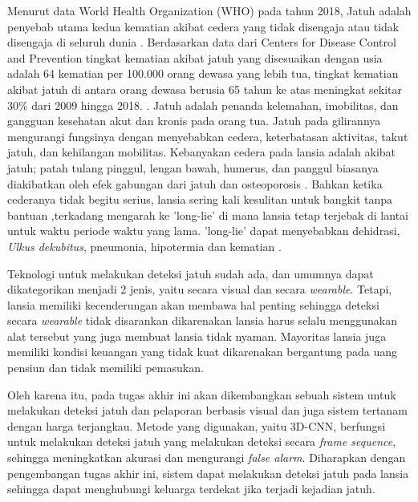 Menurut data World Health Organization (WHO) pada tahun 2018, Jatuh adalah penyebab utama kedua kematian akibat cedera yang tidak disengaja atau tidak disengaja di seluruh dunia \cite{cit:5}. Berdasarkan data dari Centers for Disease Control and Prevention tingkat kematian akibat jatuh yang disesuaikan dengan usia adalah 64 kematian per 100.000 orang dewasa yang lebih tua, tingkat kematian akibat jatuh di antara orang dewasa berusia 65 tahun ke atas meningkat sekitar 30\% dari 2009 hingga 2018. \cite{cit:6}. Jatuh adalah penanda kelemahan, imobilitas, dan gangguan kesehatan akut dan kronis pada orang tua. Jatuh pada gilirannya mengurangi fungsinya dengan menyebabkan cedera, keterbatasan aktivitas, takut jatuh, dan kehilangan mobilitas. Kebanyakan cedera pada lansia adalah akibat jatuh; patah tulang pinggul, lengan bawah, humerus, dan panggul biasanya diakibatkan oleh efek gabungan dari jatuh dan osteoporosis \cite{cit:7}. Bahkan ketika cederanya tidak begitu serius, lansia sering kali kesulitan untuk bangkit tanpa bantuan \cite{cit:8},terkadang mengarah ke 'long-lie' di mana lansia tetap terjebak di lantai untuk waktu periode waktu yang lama. 'long-lie' dapat menyebabkan dehidrasi, \textit{Ulkus dekubitus}, pneumonia, hipotermia dan kematian \cite{cit:9}.
\vspace{1ex} 

Teknologi untuk melakukan deteksi jatuh sudah ada, dan umumnya dapat dikategorikan menjadi 2 jenis, yaitu secara visual dan secara \textit{wearable}. Tetapi, lansia memiliki kecenderungan akan membawa hal penting sehingga deteksi secara \textit{wearable} tidak disarankan dikarenakan lansia harus selalu menggunakan alat tersebut yang juga membuat lansia tidak nyaman. Mayoritas lansia juga memiliki kondisi keuangan yang tidak kuat dikarenakan bergantung pada uang pensiun dan tidak memiliki pemasukan.
\vspace{1ex} 

Oleh karena itu, pada tugas akhir ini akan dikembangkan sebuah sistem untuk melakukan deteksi jatuh dan pelaporan berbasis visual dan juga sistem tertanam dengan harga terjangkau. Metode yang digunakan, yaitu 3D-CNN, berfungsi untuk melakukan deteksi jatuh yang melakukan deteksi secara \textit{frame sequence}, sehingga meningkatkan akurasi dan mengurangi \textit{false alarm}. Diharapkan dengan pengembangan tugas akhir ini, sistem dapat melakukan deteksi jatuh pada lansia sehingga dapat menghubungi keluarga terdekat jika terjadi kejadian jatuh. 
\vspace{1ex} 

